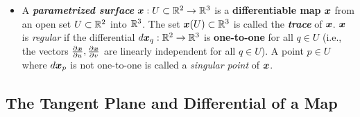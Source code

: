 \documentclass[11pt]{article}
\begin{document}
\begin{itemize}
\item \begin{definition}
A \emph{\textbf{parametrized surface}} $\boldsymbol{x}: U \subset {\mathbb R}^2 \rightarrow {\mathbb R}^3$ is a \textbf{differentiable map} $\boldsymbol{x}$ from an open set $U \subset {\mathbb R}^2$ into ${\mathbb R}^3$. The set $\boldsymbol{x}(U) \subset {\mathbb R}^3$ is called the \emph{\textbf{trace}} of $\boldsymbol{x}$. $\boldsymbol{x}$ is \emph{regular} if the differential $d\boldsymbol{x}_q: {\mathbb R}^2 \rightarrow {\mathbb R}^3$ is \textbf{one-to-one} for all $q \in U$ (i.e., the vectors $\frac{\partial \boldsymbol{x}}{ \partial u}, \frac{\partial \boldsymbol{x}}{ \partial v}$ are linearly independent for all $q \in U$). A point $p \in U$ where $d\boldsymbol{x}_p$ is not one-to-one is called a \emph{singular point} of $\boldsymbol{x}$.
\end{definition}
\end{itemize}


\subsection{The Tangent Plane and Differential of a Map}
\end{document}
